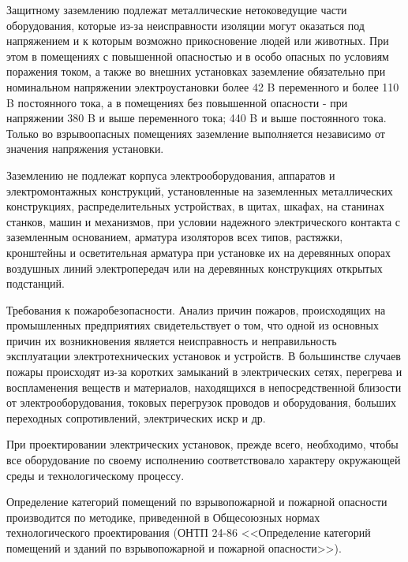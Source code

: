         Защитному заземлению подлежат металлические нетоковедущие части
        оборудования, которые из-за неисправности изоляции могут оказаться под
        напряжением и к которым возможно прикосновение людей или животных. При
        этом в помещениях с повышенной опасностью и в особо опасных по условиям
        поражения током, а также во внешних установках заземление обязательно
        при номинальном напряжении электроустановки более 42 B переменного и
        более 110 B постоянного тока, а в помещениях без повышенной опасности -
        при напряжении 380 B и выше переменного тока; 440 B и выше постоянного
        тока. Только во взрывоопасных помещениях заземление выполняется
        независимо от значения напряжения установки.

        Заземлению не подлежат корпуса электрооборудования, аппаратов и
        электромонтажных конструкций, установленные на заземленных
        металлических конструкциях, распределительных устройствах, в щитах,
        шкафах, на станинах станков, машин и механизмов, при условии надежного
        электрического контакта с заземленным основанием, арматура изоляторов
        всех типов, растяжки, кронштейны и осветительная арматура при установке
        их на деревянных опорах воздушных линий электропередач или на
        деревянных конструкциях открытых подстанций.

        Требования к пожаробезопасности.
        Анализ причин пожаров, происходящих на промышленных предприятиях
        свидетельствует о том, что одной из основных причин их возникновения
        является неисправность и неправильность эксплуатации электротехнических
        установок и устройств. В большинстве случаев пожары происходят из-за
        коротких замыканий в электрических сетях, перегрева и воспламенения
        веществ и материалов, находящихся в непосредственной близости от
        электрооборудования, токовых перегрузок проводов и оборудования,
        больших переходных сопротивлений, электрических искр и др.

        При проектировании электрических установок, прежде всего, необходимо,
        чтобы все оборудование по своему исполнению соответствовало характеру
        окружающей среды и технологическому процессу.

        Определение категорий помещений по взрывопожарной и пожарной опасности
        производится по методике, приведенной в Общесоюзных нормах
        технологического проектирования (ОНТП 24-86 <<Определение категорий
        помещений и зданий по взрывопожарной и пожарной опасности>>).

